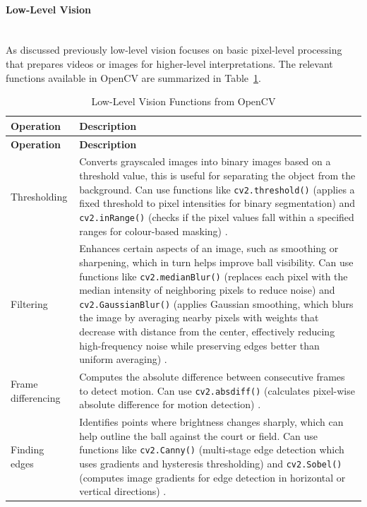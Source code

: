 \documentclass[12pt,a4paper]{article}
\begin{document}
\paragraph{Low-Level Vision}
\mbox{}\\
As discussed previously low-level vision focuses on basic pixel-level processing that prepares videos or images for higher-level interpretations. The relevant functions available in OpenCV are summarized in Table~\ref{tab:lowlevel}.

\setcounter{table}{0}
\begin{longtable}{@{}l p{}@{}}
	\caption{Low-Level Vision Functions from OpenCV}
	\label{tab:lowlevel} \\
	\toprule
	\textbf{Operation} & \textbf{Description} \\
	\midrule
	\endfirsthead
	\toprule
	\textbf{Operation} & \textbf{Description} \\
	\midrule
	\endhead
	Thresholding & Converts grayscaled images into binary images based on a threshold value, this is useful for separating the object from the background. Can use functions like \texttt{cv2.threshold()} (applies a fixed threshold to pixel intensities for binary segmentation) \parencite{opencv_threshold} and \texttt{cv2.inRange()} (checks if the pixel values fall within a specified ranges for colour-based masking) \parencite{opencv_inrange}. \\
	
	Filtering & Enhances certain aspects of an image, such as smoothing or sharpening, which in turn helps improve ball visibility. Can use functions like \texttt{cv2.medianBlur()} (replaces each pixel with the median intensity of neighboring pixels to reduce noise) \parencite{opencv_median} and \texttt{cv2.GaussianBlur()} (applies Gaussian smoothing, which blurs the image by averaging nearby pixels with weights that decrease with distance from the center, effectively reducing high-frequency noise while preserving edges better than uniform averaging) \parencite{opencv_gaussian}. \\
	
	Frame differencing & Computes the absolute difference between consecutive frames to detect motion. Can use \texttt{cv2.absdiff()} (calculates pixel-wise absolute difference for motion detection) \parencite{szeliski2010computer}. \\
	
	Finding edges & Identifies points where brightness changes sharply, which can help outline the ball against the court or field. Can use functions like \texttt{cv2.Canny()} (multi-stage edge detection which uses gradients and hysteresis thresholding) \parencite{opencv_canny} and \texttt{cv2.Sobel()} (computes image gradients for edge detection in horizontal or vertical directions) \parencite{opencv_sobel}. \\
	

\end{longtable}
\end{document}

